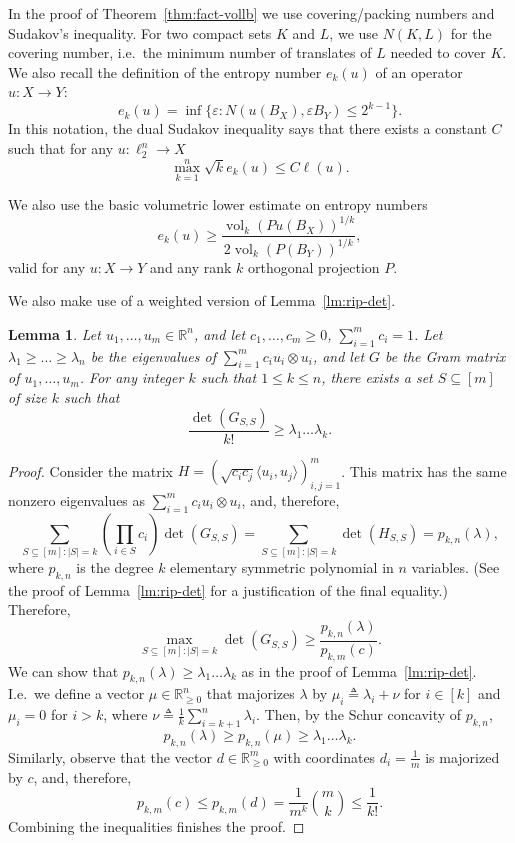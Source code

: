 \documentclass[12pt]{article}
\newtheorem{lemma}{Lemma}
\newcommand{\R}{{\mathbb{R}}}
\newcommand{\eqdef}{\triangleq}
\DeclareMathOperator{\vol}{vol}
\begin{document}
In the proof of Theorem~\ref{thm:fact-vollb} we use covering/packing
numbers and Sudakov's inequality. For two compact sets $K$ and $L$, we
use $N(K,L)$ for the covering number, i.e.~the minimum number of translates of
$L$ needed to cover $K$. We also recall the definition of the entropy
number $e_k(u)$ of an operator $u:X \to Y$:
\[
e_k(u) = \inf\{\varepsilon: N(u(B_X), \varepsilon B_Y) \le 2^{k-1}\}. 
\]
In this notation, the dual Sudakov inequality says that there exists a
constant $C$ such that for any $u:\ell_2^n \to X$
\begin{equation}
  \label{eq:sudakov}
  \max_{k = 1}^n \sqrt{k}e_k(u) \le C\ell(u). 
\end{equation}

We also use the basic volumetric lower estimate on entropy numbers
\begin{equation}
  \label{eq:entropy-vol}
  e_k(u) \ge \frac{\vol_k(Pu(B_X))^{1/k}}{2\vol_k(P(B_Y))^{1/k}},
\end{equation}
valid for any $u:X \to Y$ and any rank $k$ orthogonal projection $P$.

We also make use of a weighted version of
Lemma~\ref{lm:rip-det}.  

\begin{lemma}\label{lm:rip-det-weighted}
  Let $u_1, \ldots, u_m \in \R^n$, and let $c_1, \ldots, c_m \ge 0$,
  $\sum_{i = 1}^mc_i = 1$. Let $\lambda_1 \ge \ldots \ge \lambda_n$ be
  the eigenvalues of $\sum_{i=1}^m{c_i u_i \otimes u_i}$, and let $G$
  be the Gram matrix of $u_1, \ldots, u_m$. For any
  integer $k$ such that $1 \le k \le n$, there exists a set $S
  \subseteq [m]$ of size $k$ such that 
  \[
  \frac{\det(G_{S,S})}{k!} \ge\lambda_1 \ldots \lambda_k. 
  \]
\end{lemma}
\begin{proof}
  Consider the matrix $H = (\sqrt{c_ic_j}\langle u_i, u_j
  \rangle)_{i,j = 1}^m$. This matrix has the same nonzero eigenvalues as
  $\sum_{i=1}^m{c_i u_i \otimes u_i}$, and, therefore,
  \[
  \sum_{S \subseteq [m]: |S| = k}{\left(\prod_{i \in S}{c_i}\right)\det(G_{S,S})}
  = \sum_{S \subseteq [m]: |S| = k}\det(H_{S,S}) = p_{k,n}(\lambda),
  \]
  where $p_{k,n}$ is the degree $k$ elementary symmetric polynomial in $n$
  variables. (See the proof of Lemma~\ref{lm:rip-det} for a
  justification of the final equality.) Therefore, 
  \[
  \max_{S \subseteq [m]: |S| = k}\det(G_{S,S}) 
  \ge \frac{p_{k,n}(\lambda)}{p_{k,m}(c)}. 
  \]
  We can show that $p_{k,n}(\lambda) \ge \lambda_1 \ldots \lambda_k$
  as in the proof of Lemma~\ref{lm:rip-det}. I.e.~we define a
  vector $\mu \in \R^n_{\ge 0}$ that majorizes $\lambda$ by $\mu_i
  \eqdef \lambda_i + \nu$ for $i \in [k]$ and $\mu_i = 0$ for $i > k$,
  where $\nu \eqdef \frac{1}{k}\sum_{i = k+1}^n{\lambda_i}$. Then, by
  the Schur concavity of $p_{k,n}$,
  \[
  p_{k,n}(\lambda) \ge p_{k,n}(\mu) \ge \lambda_1 \ldots \lambda_k.
  \]
  Similarly, observe that the vector $d \in \R^m_{\ge 0}$ with coordinates $d_i =
  \frac{1}{m}$ is majorized by $c$, and, therefore, 
  \[
  p_{k,m}(c) \le p_{k,m}(d) = \frac{1}{m^k} {m \choose k} \le \frac{1}{k!}.
  \]
  Combining the inequalities finishes the proof. 
\end{proof}
\end{document}
